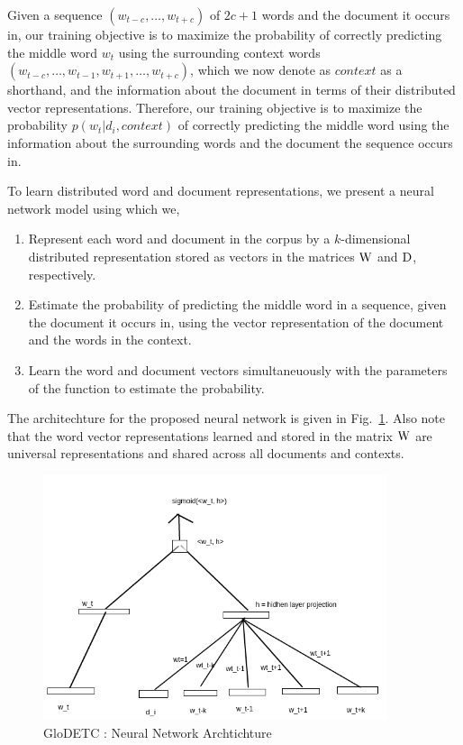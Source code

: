Given a sequence $(w_{t-c}, \ldots, w_{t+c})$ of $2c+1$ words and the document it occurs in, our training objective is to maximize the probability of correctly predicting the middle word $w_{t}$ using the surrounding context words $(w_{t-c}, \ldots, w_{t-1}, w_{t+1}, \ldots, w_{t+c})$, which we now denote as $context$ as a shorthand, and the information about the document in terms of their distributed vector representations. 
Therefore, our training objective is to maximize the probability $p(w_{t} | d_{i}, context)$ of correctly predicting the middle word using the information about the surrounding words and the document the sequence occurs in. 

To learn distributed word and document representations, we present a neural network model using which we,
\begin{enumerate}
\item Represent each word and document in the corpus by a $k$-dimensional distributed representation stored as vectors in the matrices $\mathrm{W}$ and $\mathrm{D}$, respectively.
\item Estimate the probability of predicting the middle word in a sequence, given the document it occurs in, using the vector representation of the document and the words in the context.
\item Learn the word and document vectors simultaneuously with the parameters of the function to estimate the probability.
\end{enumerate}
The architechture for the proposed neural network is given in Fig.~\ref{fig:nn:archi}.
Also note that the word vector representations learned and stored in the matrix $\mathrm{W}$ are universal representations and shared across all documents and contexts.
\begin{figure}[h!]
    \centering
        \includegraphics[width=0.9\textwidth]{figs/nn_arch.png}
    \caption{GloDETC : Neural Network Archtichture }
    \label{fig:nn:archi}
\end{figure}

